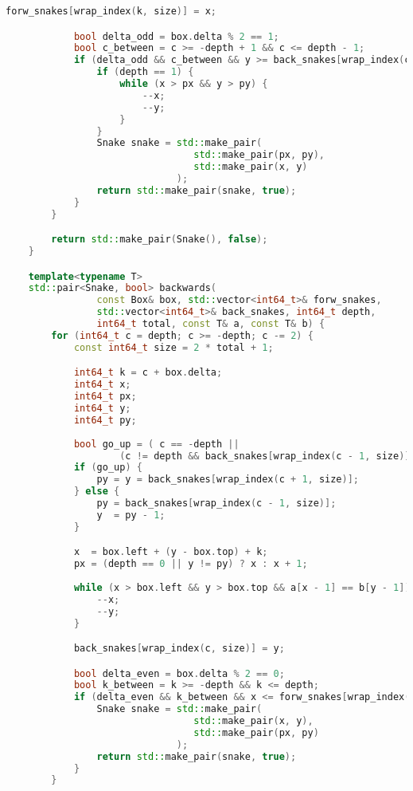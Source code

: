 \begin{lstlisting}[language=C++]
            forw_snakes[wrap_index(k, size)] = x;

            bool delta_odd = box.delta % 2 == 1;
            bool c_between = c >= -depth + 1 && c <= depth - 1;
            if (delta_odd && c_between && y >= back_snakes[wrap_index(c, size)]){
                if (depth == 1) {
                    while (x > px && y > py) {
                        --x;
                        --y;
                    }
                }
                Snake snake = std::make_pair(
                                 std::make_pair(px, py),
                                 std::make_pair(x, y)
                              );
                return std::make_pair(snake, true);
            }
        }

        return std::make_pair(Snake(), false);
    }

    template<typename T>
    std::pair<Snake, bool> backwards(
                const Box& box, std::vector<int64_t>& forw_snakes,
                std::vector<int64_t>& back_snakes, int64_t depth,
                int64_t total, const T& a, const T& b) {
        for (int64_t c = depth; c >= -depth; c -= 2) {
            const int64_t size = 2 * total + 1;

            int64_t k = c + box.delta;
            int64_t x;
            int64_t px;
            int64_t y;
            int64_t py;
            
            bool go_up = ( c == -depth || 
                    (c != depth && back_snakes[wrap_index(c - 1, size)] > back_snakes[wrap_index(c + 1, size)]) );
            if (go_up) {
                py = y = back_snakes[wrap_index(c + 1, size)];
            } else {
                py = back_snakes[wrap_index(c - 1, size)];
                y  = py - 1;
            }

            x  = box.left + (y - box.top) + k;
            px = (depth == 0 || y != py) ? x : x + 1;
            
            while (x > box.left && y > box.top && a[x - 1] == b[y - 1]) {
                --x;
                --y;
            }

            back_snakes[wrap_index(c, size)] = y;

            bool delta_even = box.delta % 2 == 0;
            bool k_between = k >= -depth && k <= depth;
            if (delta_even && k_between && x <= forw_snakes[wrap_index(k, size)]) {
                Snake snake = std::make_pair(
                                 std::make_pair(x, y),
                                 std::make_pair(px, py)
                              );
                return std::make_pair(snake, true);
            }
        }


\end{lstlisting}
